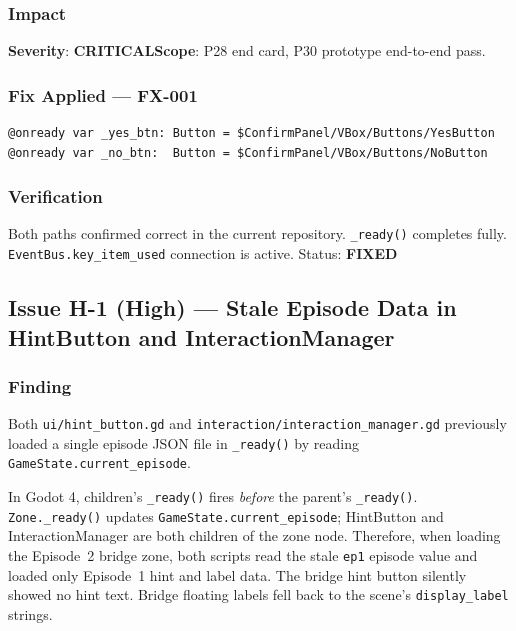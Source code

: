 \documentclass[12pt, a4paper]{article}
\newcommand{\sevCrit}{\textcolor{critred}{\textbf{CRITICAL}}}
\newcommand{\sevFixed}{\textcolor{passgre}{\textbf{FIXED}}}
\begin{document}
\subsubsection*{Impact}

\textbf{Severity}: \sevCrit\quad\textbf{Scope}: P28 end card, P30 prototype end-to-end pass.

\subsubsection*{Fix Applied — FX-001}

\begin{lstlisting}
@onready var _yes_btn: Button = $ConfirmPanel/VBox/Buttons/YesButton
@onready var _no_btn:  Button = $ConfirmPanel/VBox/Buttons/NoButton
\end{lstlisting}

\subsubsection*{Verification}

Both paths confirmed correct in the current repository. \texttt{\_ready()}
completes fully. \texttt{EventBus.key\_item\_used} connection is active.
Status: \sevFixed

\subsection{Issue H-1 (High) — Stale Episode Data in HintButton and InteractionManager}

\subsubsection*{Finding}

Both \texttt{ui/hint\_button.gd} and \texttt{interaction/interaction\_manager.gd}
previously loaded a single episode JSON file in \texttt{\_ready()} by reading
\texttt{GameState.current\_episode}.

In Godot 4, children's \texttt{\_ready()} fires \textit{before} the parent's
\texttt{\_ready()}. \texttt{Zone.\_ready()} updates \texttt{GameState.current\_episode};
HintButton and InteractionManager are both children of the zone node.
Therefore, when loading the Episode~2 bridge zone, both scripts read the stale
\texttt{ep1} episode value and loaded only Episode~1 hint and label data.
The bridge hint button silently showed no hint text. Bridge floating labels
fell back to the scene's \texttt{display\_label} strings.
\end{document}
